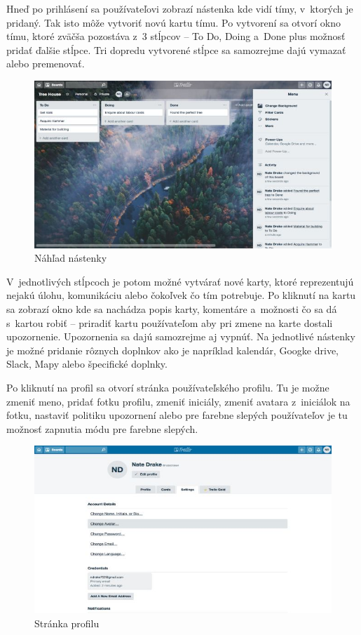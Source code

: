 \indent Hneď po prihlásení sa používateľovi zobrazí nástenka kde vidí tímy, v ktorých je pridaný. Tak isto môže vytvoriť novú kartu tímu. Po vytvorení sa otvorí okno tímu, ktoré zväčša pozostáva z 3 stĺpcov – To Do, Doing a Done plus možnosť pridať ďalšie stĺpce. Tri dopredu vytvorené stĺpce sa samozrejme dajú vymazať alebo premenovať. 

\begin{figure}[H]
    \centering
    \includegraphics[scale=0.65]{img/obr-trello.jpg}
    \caption{Náhľad nástenky}
    \label{fig:nastenka}
\end{figure}

\indent V jednotlivých stĺpcoch je potom možné vytvárať nové karty, ktoré reprezentujú nejakú úlohu, komunikáciu alebo čokoľvek čo tím potrebuje. Po kliknutí na kartu sa zobrazí okno kde sa nachádza popis karty, komentáre a možnosti čo sa dá s kartou robiť – priradiť kartu používateľom aby pri zmene na karte dostali upozornenie. Upozornenia sa dajú samozrejme aj vypnúť. Na jednotlivé nástenky je možné pridanie rôznych doplnkov ako je napríklad kalendár, Googke drive, Slack, Mapy alebo špecifické doplnky. 

\indent Po kliknutí na profil sa otvorí stránka používateľského profilu. Tu je možne zmeniť meno, pridať fotku profilu, zmeniť iniciály, zmeniť avatara z iniciálok na fotku, nastaviť politiku upozornení alebo pre farebne slepých používateľov je tu možnosť zapnutia módu pre farebne slepých. 

\begin{figure}[H]
    \centering
    \includegraphics[scale=0.65]{img/obr-trello-profil.jpg}
    \caption{Stránka profilu}
    \label{fig:profil}
\end{figure}

